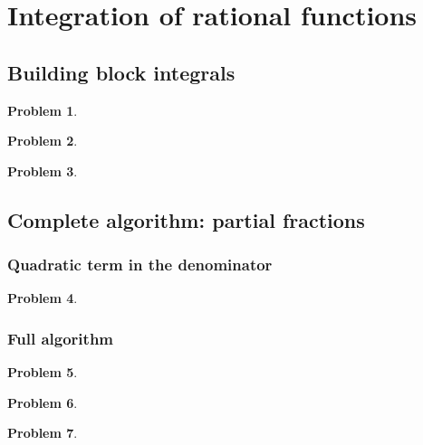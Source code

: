 \documentclass{article}
\newtheorem{problem}{Problem}
\begin{document}
\section{Integration of rational functions}
\subsection{Building block integrals}
\begin{problem}

\end{problem}


\begin{problem}

\end{problem}

\begin{problem}

\end{problem}

\subsection{Complete algorithm: partial fractions}
\subsubsection{Quadratic term in the denominator}
\begin{problem}

\end{problem}
\subsubsection{Full algorithm}
\begin{problem}

\end{problem}
\begin{problem}

\end{problem}
\begin{problem}

\end{problem}

\end{document}
